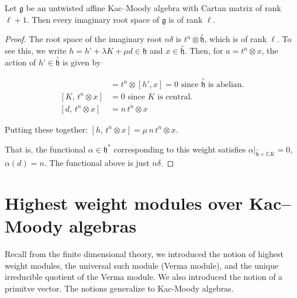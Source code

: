 \documentclass[12pt]{article}
\begin{document}
\begin{corollary}
    Let $\mathfrak{g}$ be an untwisted affine Kac–Moody algebra with Cartan matrix of rank $\ell+1$. Then every imaginary root space of $\mathfrak{g}$ is of rank $\ell$.
\end{corollary}

\begin{proof}
    The root space of the imaginary root $n\delta$ is $t^n \otimes \overset{\circ}{\mathfrak{h}}$, which is of rank $\ell$. To see this, we write  $h = h’ + \lambda K + \mu d \in \mathfrak{h}$ and $x \in \overset{\circ}{\mathfrak{h}}$. Then, for $a = t^n \otimes x$, the action of $h’ \in \overset{\circ}{\mathfrak{h}}$ is given by

\begin{align*}
[h',\, t^n \otimes x]
&= t^n \otimes [h',x] = 0 \text{ since $\overset{\circ}{\mathfrak{h}}$ is abelian.}\\
[K,\, t^n \otimes x] &= 0 \text{ since $K$ is central.}\\
[d,\, t^n \otimes x] &= n\,t^n \otimes x
\end{align*}

Putting these together:
$[h,\, t^n \otimes x] = \mu\,n\,t^n \otimes x$.

That is, the functional $\alpha \in \mathfrak{h}^*$ corresponding to this weight satisfies $\alpha|_{\overset{\circ}{\mathfrak{h}} + \mathbb{C}K} = 0$,
$\alpha(d) = n$. The functional above is just $n\delta$.
\end{proof}

\section{Highest weight modules over Kac–Moody algebras}
Recall from the finite dimensional theory, we introduced the notion of highest weight modules, the universal such module (Verma module), and the unique irreducible quotient of the Verma module. We also introduced the notion of a primitve vector. The notions generalize to Kac-Moody algebras.
\end{document}
